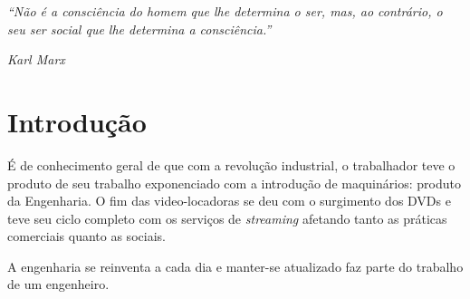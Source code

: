 \documentclass[
	12pt,				%
	openright,			%
	oneside,			%
	a4paper,			%
    tikz,
	english,			%
	french,				%
	spanish,			%
	brazil				%
	]{abntex2}
\begin{document}

\frenchspacing


\imprimircapa{}

\imprimirfolhaderosto*

\begin{epigrafe}
    \vspace*{\fill}
	\begin{flushright}
        \begin{adjustwidth}{7.5cm}{}
        \textit{``Não é a consciência do homem que lhe
            determina o ser, mas, ao contrário,
            o seu ser social que lhe determina a
            consciência.''}
        \end{adjustwidth}
        \textit{Karl Marx}
	\end{flushright}
\end{epigrafe}

\tableofcontents*
\cleardoublepage{}

\textual{}

\chapter*[Introdução]{Introdução}
É de conhecimento geral de que com a revolução industrial,
o trabalhador teve o produto de seu trabalho exponenciado
com a introdução de maquinários: produto da Engenharia.
O fim das video-locadoras se deu com o surgimento dos DVDs
e teve seu ciclo completo com os serviços de \textit{streaming}
afetando tanto as práticas comerciais quanto as sociais.

\par
A engenharia se reinventa a cada dia e manter-se atualizado
faz parte do trabalho de um engenheiro.
\end{document}
